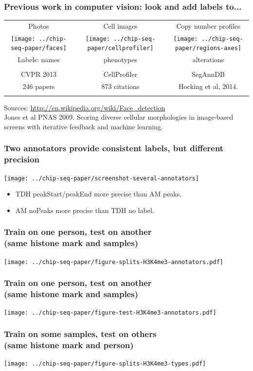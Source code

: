 \documentclass{beamer}
\begin{document}
\begin{frame}
  \frametitle{Previous work in computer vision: look and add labels
    to...}
  \begin{tabular}{ccc}
    Photos & Cell images & Copy number profiles \\
    \texttt{[image: ../chip-seq-paper/faces]} &
    \texttt{[image: ../chip-seq-paper/cellprofiler]} &
    \texttt{[image: ../chip-seq-paper/regions-axes]}\\
    Labels: names & phenotypes & alterations \\ \\
    CVPR 2013 & CellProfiler & SegAnnDB \\
    246 papers & 873 citations & Hocking et al, 2014. \\
     &
  \end{tabular}
  Sources: \url{http://en.wikipedia.org/wiki/Face_detection}\\
  Jones et al PNAS 2009. Scoring diverse cellular morphologies in
  image-based screens with iterative feedback and machine learning.
\end{frame}

\begin{frame}
  \frametitle{Two annotators provide consistent labels, but different
    precision}
  \texttt{[image: ../chip-seq-paper/screenshot-several-annotators]}

  \begin{itemize}
  \item TDH peakStart/peakEnd more precise than AM peaks.
  \item AM noPeaks more precise than TDH no label.
  \end{itemize}
\end{frame}

\begin{frame}
  \frametitle{Train on one person, test on another\\
(same histone mark and samples)}
  \texttt{[image: ../chip-seq-paper/figure-splits-H3K4me3-annotators.pdf]}
\end{frame}

\begin{frame}
  \frametitle{Train on one person, test on another\\
(same histone mark and samples)}
  \texttt{[image: ../chip-seq-paper/figure-test-H3K4me3-annotators.pdf]}
\end{frame}

\begin{frame}
  \frametitle{Train on some samples, test on others\\
(same histone mark and person)}
  \texttt{[image: ../chip-seq-paper/figure-splits-H3K4me3-types.pdf]}
\end{frame}
\end{document}
